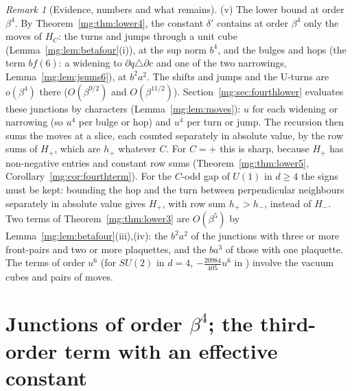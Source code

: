 \documentclass[11pt,a4paper]{article}
\theoremstyle{definition}
\theoremstyle{remark}
\newtheorem{remark}[theorem]{Remark}
\begin{document}
\begin{remark}[Evidence, numbers and what remains]
(v) The lower bound at order $\beta^4$. By Theorem~\ref{mg:thm:lower4}, the constant $\delta'$ contains at order $\beta^4$ only the moves of $H_C$:
the turns and jumps through a unit cube (Lemma~\ref{mg:lem:betafour}(i)), at the sup norm $b^4$, and the bulges and hops (the term $bf(6)$: a widening to
$\partial q\triangle\partial c$ and one of the two narrowings, Lemma~\ref{mg:lem:jsums6}), at $b^2a^2$. The shifts and jumps and the U-turns are $o(\beta^4)$ there ($O(\beta^{9/2})$ and $O(\beta^{11/2})$).
Section~\ref{mg:sec:fourthlower} evaluates these junctions by characters (Lemma~\ref{mg:lem:moves}): $u$ for each widening or narrowing (so $u^4$ per bulge or hop) and $u^4$ per turn
or jump. The recursion then sums the moves at a slice, each counted separately in absolute value, by the row sums of $H_+$, which are $h_+$ whatever $C$. For $C=+$
this is sharp, because $H_+$ has non-negative entries and constant row sums (Theorem~\ref{mg:thm:lower5}, Corollary~\ref{mg:cor:fourthterm}). For the $C$-odd gap of $U(1)$ in $d\ge4$ the signs must be kept: bounding the hop and the turn between
perpendicular neighbours separately in absolute value gives $H_+$, with row sum $h_+>h_-$, instead of $H_-$.
Two terms of Theorem~\ref{mg:thm:lower3} are $O(\beta^5)$ by Lemma~\ref{mg:lem:betafour}(iii),(iv): the $b^2a^2$ of the junctions with three or more front-pairs and two
or more plaquettes, and the $ba^3$ of those with one plaquette.
The terms of order $u^6$ (for $SU(2)$ in $d=4$, $-\frac{20984}{405}u^6$ in \cite{LMP07}) involve the vacuum cubes and pairs of moves.
\end{remark}

\section{Junctions of order \texorpdfstring{$\beta^4$}{beta**4}; the third-order term with an effective constant}\label{mg:sec:betafour}
\end{document}
